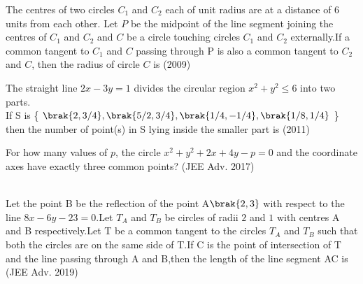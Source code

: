 \iffalse
  \title{Assignment 1}
  \author{Srihaas Gunda}
  \section{integer}
\fi



\item The centres of two circles $C_1$ and $C_2$ each of unit radius are at a distance of $6$ units from each other. Let $P$ be the midpoint of the line segment joining the centres of $C_1$ and $C_2$ and $C$ be a circle touching circles $C_1$ and $C_2$ externally.If a common tangent to $C_1$ and $C$ passing through P is also a common tangent to $C_2$ and $C$, then the radius of circle $C$ is \hfill(2009)\\
\item The straight line $2x-3y=1$ divides the circular region $x^2+y^2\leq6$ into two parts.\\
If  S  is \{ $\brak{2,3/4},\brak{5/2,3/4},\brak{1/4,-1/4},\brak{1/8,1/4}$ \}  then the  number of point(s) in S lying inside the smaller part is \hfill(2011)\\
\item For how many values of $p$, the circle $x^2+y^2+2x+4y-p=0$ and the coordinate axes have exactly three common points? \hfill(JEE Adv. 2017)\\
\\
\item Let the point B be the reflection of the point A$\brak{2,3}$ with respect to the line $8x-6y-23=0$.Let $T_A$ and $T_B$ be circles of radii $2$ and $1$ with centres A and B respectively.Let T be a common tangent to the circles $T_A$ and $T_B$ such that both the circles are on the same side of T.If C is the point of intersection of T and the line passing through A and B,then the length of the line segment AC is \hfill(JEE Adv. 2019)

